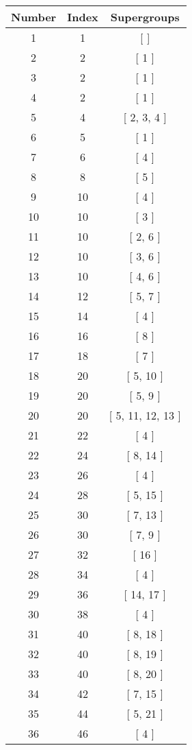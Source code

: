 \begin{center}
\begin{longtable}[H]{|| c c c ||}
\hline
Number &  Index &  Supergroups
\\\hline
1 & 1 & [  ]
\\\hline
2 & 2 & [ 1 ]
\\\hline
3 & 2 & [ 1 ]
\\\hline
4 & 2 & [ 1 ]
\\\hline
5 & 4 & [ 2, 3, 4 ]
\\\hline
6 & 5 & [ 1 ]
\\\hline
7 & 6 & [ 4 ]
\\\hline
8 & 8 & [ 5 ]
\\\hline
9 & 10 & [ 4 ]
\\\hline
10 & 10 & [ 3 ]
\\\hline
11 & 10 & [ 2, 6 ]
\\\hline
12 & 10 & [ 3, 6 ]
\\\hline
13 & 10 & [ 4, 6 ]
\\\hline
14 & 12 & [ 5, 7 ]
\\\hline
15 & 14 & [ 4 ]
\\\hline
16 & 16 & [ 8 ]
\\\hline
17 & 18 & [ 7 ]
\\\hline
18 & 20 & [ 5, 10 ]
\\\hline
19 & 20 & [ 5, 9 ]
\\\hline
20 & 20 & [ 5, 11, 12, 13 ]
\\\hline
21 & 22 & [ 4 ]
\\\hline
22 & 24 & [ 8, 14 ]
\\\hline
23 & 26 & [ 4 ]
\\\hline
24 & 28 & [ 5, 15 ]
\\\hline
25 & 30 & [ 7, 13 ]
\\\hline
26 & 30 & [ 7, 9 ]
\\\hline
27 & 32 & [ 16 ]
\\\hline
28 & 34 & [ 4 ]
\\\hline
29 & 36 & [ 14, 17 ]
\\\hline
30 & 38 & [ 4 ]
\\\hline
31 & 40 & [ 8, 18 ]
\\\hline
32 & 40 & [ 8, 19 ]
\\\hline
33 & 40 & [ 8, 20 ]
\\\hline
34 & 42 & [ 7, 15 ]
\\\hline
35 & 44 & [ 5, 21 ]
\\\hline
36 & 46 & [ 4 ]
\\\hline

\end{longtable}
\end{center}
